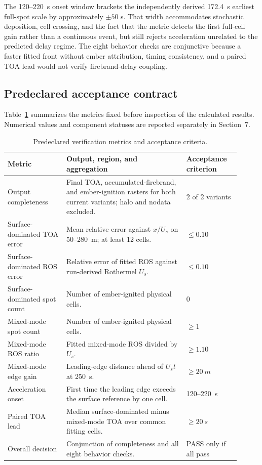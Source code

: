 The 120--\SI{220}{s} onset window brackets the independently derived
\SI{172.4}{s} earliest full-spot scale by approximately \(\pm50\) s.  That
width accommodates stochastic deposition, cell crossing, and the fact that
the metric detects the first full-cell gain rather than a continuous event,
but still rejects acceleration unrelated to the predicted delay regime.  The
eight behavior checks are conjunctive because a faster fitted front without
ember attribution, timing consistency, and a paired TOA lead would not verify
firebrand-delay coupling.

\subsection{Predeclared acceptance contract}

Table~\ref{tab:acceptance-contract} summarizes the metrics fixed before
inspection of the calculated results. Numerical values and component statuses
are reported separately in Section~7.

\begin{table}[H]
\centering
\footnotesize
\caption{Predeclared verification metrics and acceptance criteria.}
\label{tab:acceptance-contract}
\begin{tabular}{@{}p{0.23\linewidth}p{0.47\linewidth}p{0.21\linewidth}@{}}
\toprule
Metric & Output, region, and aggregation & Acceptance criterion\\
\midrule
Output completeness & Final TOA, accumulated-firebrand, and ember-ignition rasters for both current variants; halo and nodata excluded. & 2 of 2 variants \\
Surface-dominated TOA error & Mean relative error against \(x/U_s\) on 50--\SI{280}{m}; at least 12 cells. & \(\le0.10\) \\
Surface-dominated ROS error & Relative error of fitted ROS against run-derived Rothermel \(U_s\). & \(\le0.10\) \\
Surface-dominated spot count & Number of ember-ignited physical cells. & 0 \\
Mixed-mode spot count & Number of ember-ignited physical cells. & \(\ge1\) \\
Mixed-mode ROS ratio & Fitted mixed-mode ROS divided by \(U_s\). & \(\ge1.10\) \\
Mixed-mode edge gain & Leading-edge distance ahead of \(U_st\) at \SI{250}{s}. & \(\ge\SI{20}{m}\) \\
Acceleration onset & First time the leading edge exceeds the surface reference by one cell. & 120--\SI{220}{s} \\
Paired TOA lead & Median surface-dominated minus mixed-mode TOA over common fitting cells. & \(\ge\SI{20}{s}\) \\
Overall decision & Conjunction of completeness and all eight behavior checks. & PASS only if all pass \\
\bottomrule
\end{tabular}
\end{table}

